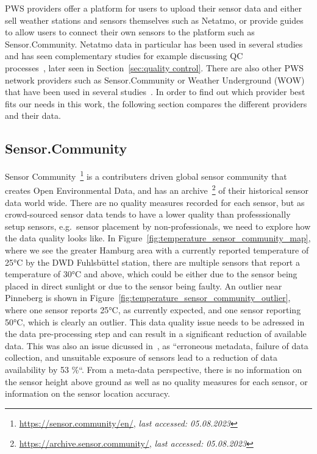 PWS providers offer a platform for users to upload their sensor data and either sell weather stations and sensors themselves such as Netatmo, or provide guides to allow users to connect their own sensors to the platform such as Sensor.Community. Netatmo data in particular has been used in several studies~\cite{meier2017crowdsourcing, hahn2022observations, venter2020hyperlocal, zumwald2021mapping} and has seen complementary studies for example discussing QC\\
processes~\cite{fenner2021crowdqc+}, later seen in Section~\ref{sec:quality control}. There are also other PWS network providers such as Sensor.Community or Weather Underground (WOW) that have been used in several studies~\cite{ho2014mapping}. In order to find out which provider best fits our needs in this work, the following section compares the different providers and their data.

\subsection{Sensor.Community}

Sensor Community~\footnote{\url{https://sensor.community/en/}, \textit{last accessed: 05.08.2023}} is a contributers driven global sensor community that creates Open Environmental Data, and has an archive~\footnote{\url{https://archive.sensor.community/}, \textit{last accessed: 05.08.2023}} of their historical sensor data world wide. There are no quality measures recorded for each sensor, but as crowd-sourced sensor data tends to have a lower quality than professsionally setup sensors, e.g.\ sensor placement by non-professionals, we need to explore how the data quality looks like.
In Figure~\ref{fig:temperature_sensor_community_map}, where we see the greater Hamburg area with a currently reported temperature of 25°C by the DWD Fuhlsbüttel station, there are multiple sensors that report a temperature of 30°C and above, which could be either due to the sensor being placed in direct sunlight or due to the sensor being faulty. An outlier near Pinneberg is shown in Figure~\ref{fig:temperature_sensor_community_outlier}, where one sensor reports 25°C, as currently expected, and one sensor reporting 50°C, which is clearly an outlier. This data quality issue needs to be adressed in the data pre-processing step and can result in a significant reduction of available data. This was also an issue dicussed in~\cite{meier2017crowdsourcing}, as ``erroneous metadata, failure of data collection, and unsuitable exposure of sensors lead to a reduction of data availability by 53 \%``.
From a meta-data perspective, there is no information on the sensor height above ground as well as no quality measures for each sensor, or information on the sensor location accuracy.

